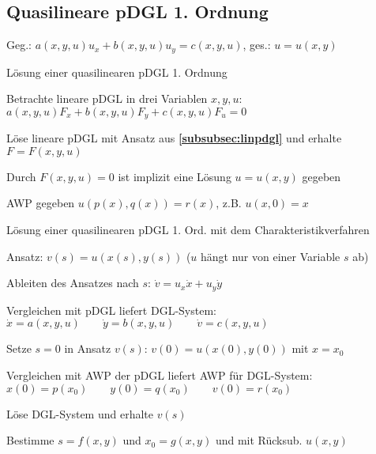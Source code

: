 \documentclass[german,color,5pt]{latex4ei/latex4ei_fs}
\begin{document}
\begin{sectionbox}
	\subsection{Quasilineare pDGL 1. Ordnung}
	Geg.: $a(x,y,u)u_x+b(x,y,u)u_y=c(x,y,u)$, ges.: $u=u(x,y)$ \\ \vspace{-1em}
	\begin{cookbox}{Lösung einer quasilinearen pDGL 1. Ordnung}
		\item Betrachte lineare pDGL in drei Variablen $x,y,u$:
		\\$a(x,y,u)F_{x}+b(x,y,u)F_{y}+c(x,y,u)F_{u}=0$
		\item Löse lineare pDGL mit Ansatz aus {\bf\ref{subsubsec:linpdgl}} und erhalte	$F=F(x,y,u) $
		\item Durch $F(x,y,u)=0 $ ist implizit eine Lösung $u=u(x,y) $ gegeben
	\end{cookbox}
	AWP gegeben $u(p(x),q(x))=r(x)$, z.B. $u(x,0)=x$
	\begin{cookbox}{Lösung einer quasilinearen pDGL 1. Ord. mit dem Charakteristikverfahren}
		\item Ansatz: $v(s)=u(x(s),y(s))$ \qquad ($u$ hängt nur von einer Variable $s$ ab)
		\item Ableiten des Ansatzes nach $s$: \quad $\dot v = u_x \dot x + u_y \dot y$
		\item Vergleichen mit pDGL liefert DGL-System:\\ 
		 $\dot x =a(x,y,u) \qquad \dot y=b(x,y,u) \qquad \dot v=c(x,y,u)$
		\item Setze $s=0$ in Ansatz $v(s)$: \quad $v(0)=u(x(0),y(0))$ mit $x=x_0$
		\item Vergleichen mit AWP der pDGL liefert AWP für DGL-System: \\
		$x(0)=p(x_0) \qquad y(0)=q(x_0) \qquad v(0)=r(x_0)$ 
		\item Löse DGL-System und erhalte $v(s)$
		\item Bestimme $s=f(x,y)$ und $x_0=g(x,y)$ und mit Rücksub. $u(x,y)$
	\end{cookbox}
\end{sectionbox}


\end{document}
